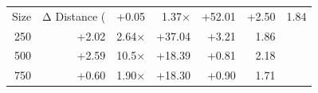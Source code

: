 \begin{tabular}{rrrrrr}
\toprule
Size & Δ Distance (%
 & +0.05 & 1.37× & +52.01 & +2.50 & 1.84 \\
250 & +2.02 & 2.64× & +37.04 & +3.21 & 1.86 \\
500 & +2.59 & 10.5× & +18.39 & +0.81 & 2.18 \\
750 & +0.60 & 1.90× & +18.30 & +0.90 & 1.71 \\
\bottomrule
\end{tabular}
